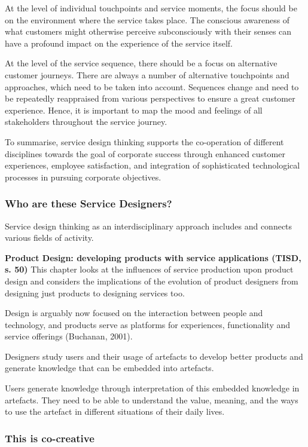 At the level of individual touchpoints and service moments, the focus should be on the environment where the service takes place. The conscious awareness of what customers might otherwise perceive subconsciously with their senses can have a profound impact on the experience of the service itself.

At the level of the service sequence, there should be a focus on alternative customer journeys. There are always a number of alternative touchpoints and approaches, which need to be taken into account. Sequences change and need to be repeatedly reappraised from various perspectives to ensure a great customer experience. Hence, it is important to map the mood and feelings of all stakeholders throughout the service journey.

To summarise, service design thinking supports the co-operation of different disciplines towards the goal of corporate success through enhanced customer experiences, employee satisfaction, and integration of sophisticated technological processes in pursuing corporate objectives.

\subsubsection{Who are these Service Designers?}

Service design thinking as an interdisciplinary approach includes and connects various fields of activity.

\textbf{Product Design: developing products with service applications (TISD, s. 50)}
This chapter looks at the influences of service production upon product design and considers the implications of the evolution of product designers from designing just products to designing services too.

Design is arguably now focused on the interaction between people and technology, and products serve as platforms for experiences, functionality and service offerings (Buchanan, 2001).

Designers study users and their usage of artefacts to develop better products and generate knowledge that can be embedded into artefacts.

Users generate knowledge through interpretation of this embedded knowledge in artefacts. They need to be able to understand the value, meaning, and the ways to use the artefact in different situations of their daily lives.

\subsubsection{This is co-creative}

